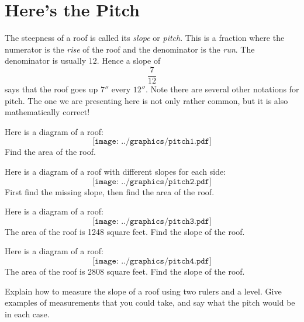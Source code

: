 \newpage
\section{Here's the Pitch}


The steepness of a roof is called its \textit{slope}
or \textit{pitch}. This is a fraction where the numerator is
the \textit{rise} of the roof and the denominator is
the \textit{run}. The denominator is usually $12$. Hence a slope of
\[
\frac{7}{12}
\]
says that the roof goes up $7''$ every $12''$. Note there are several
other notations for pitch. The one we are presenting here is not only
rather common, but it is also mathematically correct!

\begin{prob}
Here is a diagram of a roof: 
\[
\texttt{[image: ../graphics/pitch1.pdf]}
\]
Find the area of the roof. 
\end{prob}

\begin{prob}
Here is a diagram of a roof with different slopes for each side: 
\[
\texttt{[image: ../graphics/pitch2.pdf]}
\]
First find the missing slope, then find the area of the roof.
\end{prob}

\begin{prob}
Here is a diagram of a roof: 
\[
\texttt{[image: ../graphics/pitch3.pdf]}
\]
The area of the roof is 1248 square feet. Find the slope of the
roof.
\end{prob}

\begin{prob}
Here is a diagram of a roof: 
\[
\texttt{[image: ../graphics/pitch4.pdf]}
\]
The area of the roof is 2808 square feet. Find the slope of the
roof.
\end{prob}


\begin{prob}
Explain how to measure the slope of a roof using two rulers and a
level. Give examples of measurements that you could take, and say what
the pitch would be in each case.
\end{prob}

\break

